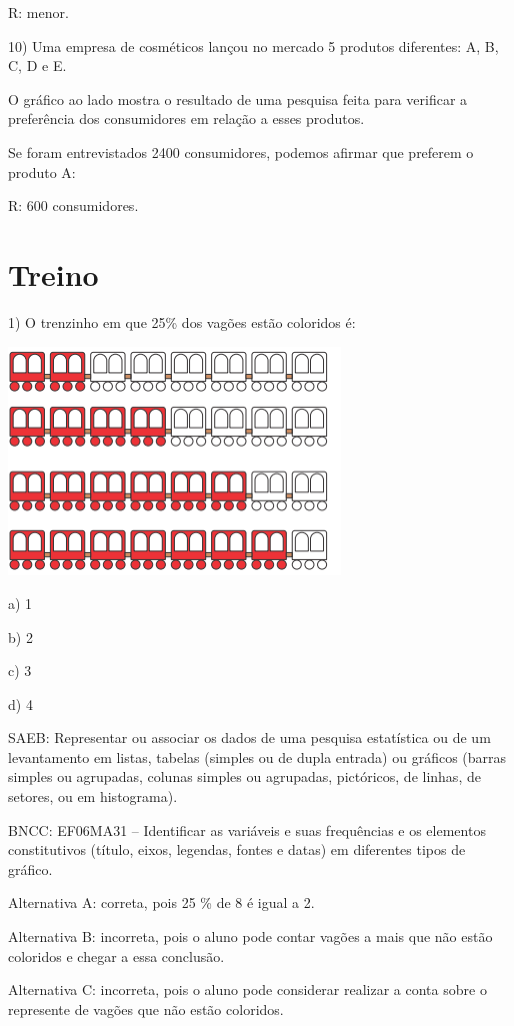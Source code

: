 R: menor.

10) Uma empresa de cosméticos lançou no mercado 5 produtos diferentes:
A, B, C, D e E.

O gráfico ao lado mostra o resultado de uma pesquisa feita para
verificar a preferência dos consumidores em relação a esses produtos.

Se foram entrevistados 2400 consumidores, podemos afirmar que preferem o
produto A:

R: 600 consumidores.

\section{Treino}

1) O trenzinho em que 25\% dos vagões estão coloridos é:

\includegraphics[width=3.46528in,height=2.38403in]{./imgSAEB_6_MAT/media/image89.png}

a) 1

b) 2

c) 3

d) 4

SAEB: Representar ou associar os dados de uma pesquisa estatística ou de
um levantamento em listas, tabelas (simples ou de dupla entrada) ou
gráficos (barras simples ou agrupadas, colunas simples ou agrupadas,
pictóricos, de linhas, de setores, ou em histograma).

BNCC: EF06MA31 -- Identificar as variáveis e suas frequências e os
elementos constitutivos (título, eixos, legendas, fontes e datas) em
diferentes tipos de gráfico.

Alternativa A: correta, pois 25 \% de 8 é igual a 2.

Alternativa B: incorreta, pois o aluno pode contar vagões a mais que não
estão coloridos e chegar a essa conclusão.

Alternativa C: incorreta, pois o aluno pode considerar realizar a conta
sobre o represente de vagões que não estão coloridos.

